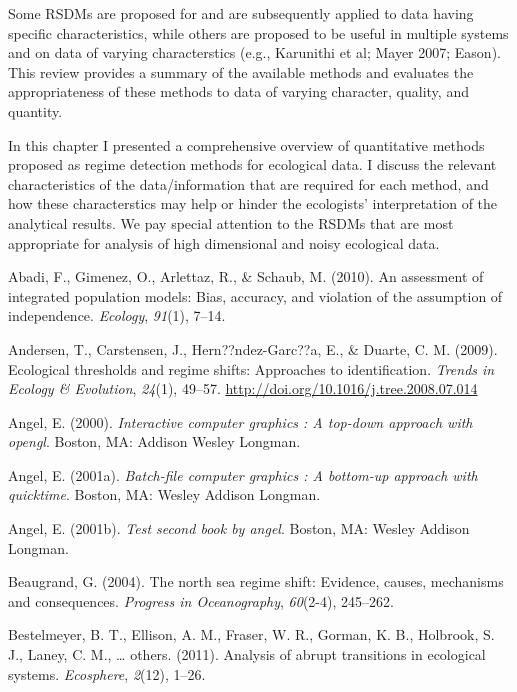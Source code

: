 \documentclass[12pt,twoside,openany]{reedthesis}
\begin{document}
Some RSDMs are proposed for and are subsequently applied to data having
specific characteristics, while others are proposed to be useful in
multiple systems and on data of varying characterstics (e.g., Karunithi
et al; Mayer 2007; Eason). This review provides a summary of the
available methods and evaluates the appropriateness of these methods to
data of varying character, quality, and quantity.

In this chapter I presented a comprehensive overview of quantitative
methods proposed as regime detection methods for ecological data. I
discuss the relevant characteristics of the data/information that are
required for each method, and how these characterstics may help or
hinder the ecologists' interpretation of the analytical results. We pay
special attention to the RSDMs that are most appropriate for analysis of
high dimensional and noisy ecological data.

\hypertarget{refs}{}
\hypertarget{ref-abadi2010assessment}{}
Abadi, F., Gimenez, O., Arlettaz, R., \& Schaub, M. (2010). An
assessment of integrated population models: Bias, accuracy, and
violation of the assumption of independence. \emph{Ecology},
\emph{91}(1), 7--14.

\hypertarget{ref-andersen_ecological_2009}{}
Andersen, T., Carstensen, J., Hern??ndez-Garc??a, E., \& Duarte, C. M.
(2009). Ecological thresholds and regime shifts: Approaches to
identification. \emph{Trends in Ecology \& Evolution}, \emph{24}(1),
49--57. \url{http://doi.org/10.1016/j.tree.2008.07.014}

\hypertarget{ref-angel2000}{}
Angel, E. (2000). \emph{Interactive computer graphics : A top-down
approach with opengl}. Boston, MA: Addison Wesley Longman.

\hypertarget{ref-angel2001}{}
Angel, E. (2001a). \emph{Batch-file computer graphics : A bottom-up
approach with quicktime}. Boston, MA: Wesley Addison Longman.

\hypertarget{ref-angel2002a}{}
Angel, E. (2001b). \emph{Test second book by angel}. Boston, MA: Wesley
Addison Longman.

\hypertarget{ref-beaugrand2004north}{}
Beaugrand, G. (2004). The north sea regime shift: Evidence, causes,
mechanisms and consequences. \emph{Progress in Oceanography},
\emph{60}(2-4), 245--262.

\hypertarget{ref-bestelmeyer_analysis_2011}{}
Bestelmeyer, B. T., Ellison, A. M., Fraser, W. R., Gorman, K. B.,
Holbrook, S. J., Laney, C. M., \ldots{} others. (2011). Analysis of
abrupt transitions in ecological systems. \emph{Ecosphere},
\emph{2}(12), 1--26.
\end{document}
